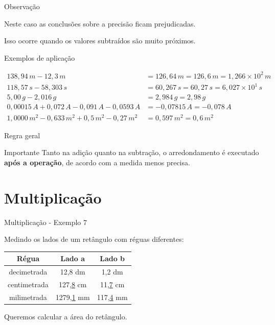 \documentclass[aspectratio=169,10pt]{beamer}
\begin{document}

\begin{frame}{Observação}

Neste caso as conclusões sobre a precisão ficam prejudicadas.

Isso ocorre quando os valores subtraídos são muito próximos.

\end{frame}


\begin{frame}{Exemplos de aplicação}

\begin{align*}
138,94\,m - 12,3\,m &= 126,64\,m = 126,6\,m = 1,266\times10^{2}\,m \\
118,57\,s - 58,303\,s &= 60,267\,s = 60,27\,s = 6,027\times10^{1}\,s \\
5,00\,g - 2,016\,g &= 2,984\,g = 2,98\,g \\
0,00015\,A + 0,072\,A - 0,091\,A - 0,0593\,A &= -0,07815\,A = -0,078\,A \\
1,0000\,m^2 - 0,633\,m^2 + 0,5\,m^2 - 0,27\,m^2 &= 0,597\,m^2 = 0,6\,m^2
\end{align*}

\end{frame}


\begin{frame}{Regra geral}

\begin{block}{Importante}
Tanto na adição quanto na subtração, o arredondamento é executado
\textbf{após a operação}, de acordo com a medida menos precisa.
\end{block}

\end{frame} 



\section{Multiplicação}

\begin{frame}{Multiplicação - Exemplo 7}

Medindo os lados de um retângulo com réguas diferentes:

\begin{center}
\begin{tabular}{ccc}
Régua & Lado a & Lado b\\
\hline
decimetrada & 12,8 dm & 1,2 dm\\
centimetrada & 127,\underline{8} cm & 11,\underline{7} cm\\
milimetrada & 1279,\underline{1} mm & 117,\underline{4} mm
\end{tabular}
\end{center}

Queremos calcular a área do retângulo.

\end{frame}
\end{document}
